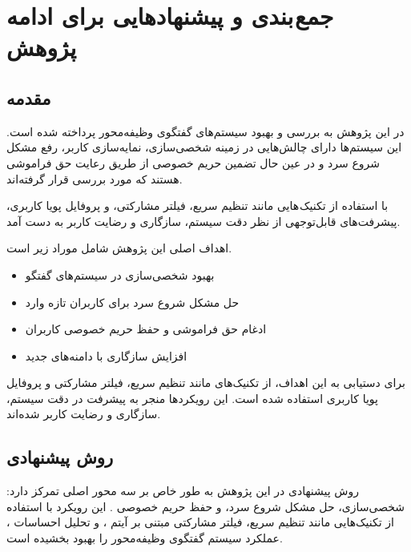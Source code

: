 \chapter{جمع بندی و پیشنهادهایی برای ادامه پژوهش}
\section{مقدمه}

در این پژوهش به بررسی و بهبود سیستم‌های گفتگوی وظیفه‌محور پرداخته شده است. این سیستم‌ها دارای چالش‌هایی در زمینه شخصی‌سازی، نمایه‌سازی کاربر، رفع مشکل شروع سرد و در عین حال تضمین حریم خصوصی از طریق رعایت حق فراموشی هستند که مورد بررسی قرار گرفته‌اند.

با استفاده از تکنیک هایی مانند تنظیم سریع، فیلتر مشارکتی، و پروفایل پویا کاربری، پیشرفت‌های قابل‌توجهی از نظر دقت سیستم، سازگاری و رضایت کاربر به دست آمد.

اهداف اصلی این پژوهش شامل موراد زیر است.

\begin{itemize}
\item
بهبود شخصی‌سازی در سیستم‌های گفتگو
\item 
حل مشکل شروع سرد برای کاربران تازه وارد
\item    
ادغام حق فراموشی و حفظ حریم خصوصی کاربران
\item    
افزایش سازگاری با دامنه‌های جدید
\end{itemize}
برای دستیابی به این اهداف، از تکنیک‌های مانند تنظیم سریع، فیلتر مشارکتی و پروفایل پویا کاربری استفاده شده است. این رویکردها منجر به پیشرفت‌ در دقت سیستم، سازگاری و رضایت کاربر شده‌اند.

\section{روش پیشنهادی}
روش پیشنهادی در این پژوهش به طور خاص بر سه محور اصلی تمرکز دارد: شخصی‌سازی، حل مشکل شروع سرد، و حفظ حریم خصوصی . این رویکرد با استفاده از تکنیک‌هایی مانند تنظیم سریع، فیلتر مشارکتی مبتنی بر آیتم ، و تحلیل احساسات ، عملکرد سیستم گفتگوی وظیفه‌محور را بهبود بخشیده است.

